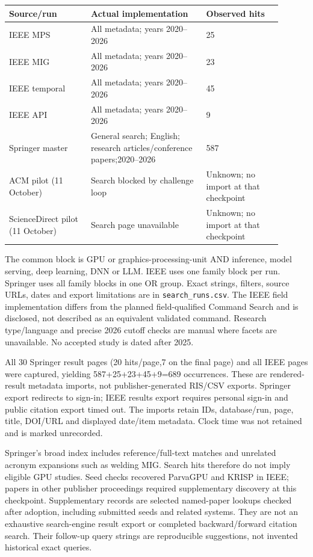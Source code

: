 \documentclass[12pt,a4paper]{article}
\begin{document}
\begin{longtable}{P{0.27\linewidth}P{0.38\linewidth}P{0.25\linewidth}}
\toprule Source/run & Actual implementation & Observed hits\\\midrule\endhead
IEEE MPS & All metadata; years 2020--2026 &25\\
IEEE MIG & All metadata; years 2020--2026 &23\\
IEEE temporal & All metadata; years 2020--2026 &45\\
IEEE API & All metadata; years 2020--2026 &9\\
Springer master & General search; English; research articles/conference papers;2020--2026 &587\\
ACM pilot (11 October) & Search blocked by challenge loop &Unknown; no import at that checkpoint\\
ScienceDirect pilot (11 October) & Search page unavailable &Unknown; no import at that checkpoint\\
\bottomrule
\end{longtable}
The common block is GPU or graphics-processing-unit AND inference, model serving, deep learning, DNN or LLM. IEEE uses one family block per run. Springer uses all family blocks in one OR group. Exact strings, filters, source URLs, dates and export limitations are in \texttt{search\_runs.csv}. The IEEE field implementation differs from the planned field-qualified Command Search and is disclosed, not described as an equivalent validated command. Research type/language and precise 2026 cutoff checks are manual where facets are unavailable. No accepted study is dated after 2025.

All 30 Springer result pages (20 hits/page,7 on the final page) and all IEEE pages were captured, yielding 587+25+23+45+9=689 occurrences. These are rendered-result metadata imports, not publisher-generated RIS/CSV exports. Springer export redirects to sign-in; IEEE results export requires personal sign-in and public citation export timed out. The imports retain IDs, database/run, page, title, DOI/URL and displayed date/item metadata. Clock time was not retained and is marked unrecorded.

Springer's broad index includes reference/full-text matches and unrelated acronym expansions such as welding MIG. Search hits therefore do not imply eligible GPU studies. Seed checks recovered ParvaGPU and KRISP in IEEE; papers in other publisher proceedings required supplementary discovery at this checkpoint. Supplementary records are selected named-paper lookups checked after adoption, including submitted seeds and related systems. They are not an exhaustive search-engine result export or completed backward/forward citation search. Their follow-up query strings are reproducible suggestions, not invented historical exact queries.
\end{document}
